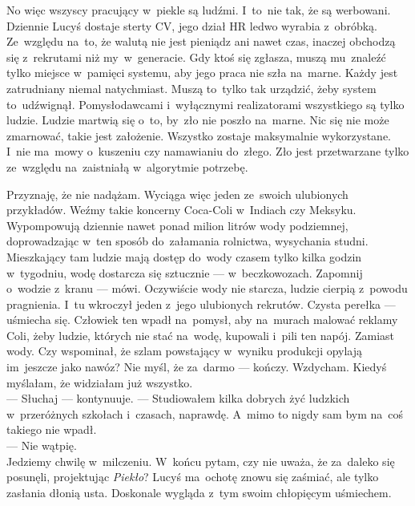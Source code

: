 \documentclass[9pt, a5paper]{memoir}
\begin{document}
No więc wszyscy pracujący w~piekle są ludźmi. I~to~nie tak, że są werbowani. Dziennie Lucyś dostaje sterty CV, jego dział HR ledwo wyrabia z~obróbką. Ze~względu na~to, że walutą nie jest pieniądz ani nawet czas, inaczej obchodzą się z~rekrutami niż my~w~generacie. Gdy ktoś się zgłasza, muszą mu~znaleźć tylko miejsce w~pamięci systemu, aby jego praca nie szła na~marne. Każdy jest zatrudniany niemal natychmiast. Muszą to~tylko tak urządzić, żeby system to~udźwignął. Pomysłodawcami i~wyłącznymi realizatorami wszystkiego są tylko ludzie. Ludzie martwią się o~to, by~zło nie poszło na~marne. Nic się nie może zmarnować, takie jest założenie. Wszystko zostaje maksymalnie wykorzystane. I~nie ma~mowy o~kuszeniu czy namawianiu do~złego. Zło jest przetwarzane tylko ze~względu na~zaistniałą w~algorytmie potrzebę.

Przyznaję, że nie nadążam. Wyciąga więc jeden ze~swoich ulubionych przykładów. Weźmy takie koncerny Coca-Coli w~Indiach czy Meksyku. Wypompowują dziennie nawet ponad milion litrów wody podziemnej, doprowadzając w~ten sposób do~załamania rolnictwa, wysychania studni. Mieszkający tam ludzie mają dostęp do~wody czasem tylko kilka godzin w~tygodniu, wodę dostarcza się sztucznie --- w~beczkowozach. Zapomnij o~wodzie z~kranu --- mówi. Oczywiście wody nie starcza, ludzie cierpią z~powodu pragnienia. I~tu wkroczył jeden z~jego ulubionych rekrutów. Czysta perełka --- uśmiecha się. Człowiek ten wpadł na~pomysł, aby na~murach malować reklamy Coli, żeby ludzie, których nie stać na~wodę, kupowali i~pili ten napój. Zamiast wody. Czy wspominał, że szlam powstający w~wyniku produkcji opylają im~jeszcze jako nawóz? Nie myśl, że za~darmo --- kończy. Wzdycham. Kiedyś myślałam, że widziałam już wszystko.\\
--- Słuchaj --- kontynuuje. --- Studiowałem kilka dobrych żyć ludzkich w~przeróżnych szkołach i~czasach, naprawdę. A~mimo to nigdy sam bym na~coś takiego nie wpadł.\\
--- Nie wątpię.\\
Jedziemy chwilę w~milczeniu. W~końcu pytam, czy nie uważa, że za~daleko się posunęli, projektując \textit{Piekło}? Lucyś ma~ochotę znowu się zaśmiać, ale tylko zasłania dłonią usta. Doskonale wygląda z~tym swoim chłopięcym uśmiechem.\\
\end{document}
